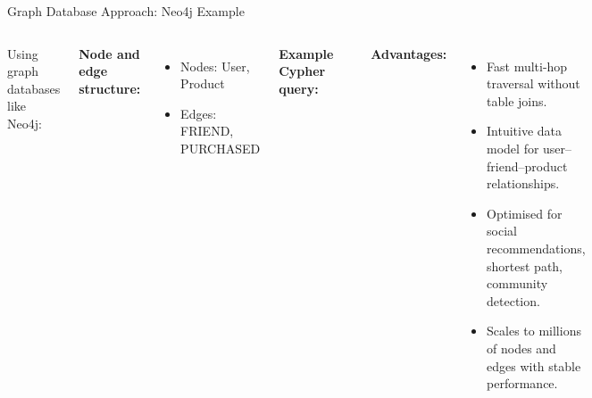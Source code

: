 \documentclass[aspectratio=169, table]{beamer}
\begin{document}
\begin{frame}[fragile]{Graph Database Approach: Neo4j Example}
	\vspace{20pt}
	
	\begin{columns}[T]
		
		Using graph databases like Neo4j:
		
		\vspace{5pt}
		\textbf{Node and edge structure:}
		\begin{itemize}
			\item Nodes: User, Product
			\item Edges: FRIEND, PURCHASED
		\end{itemize}
		
		\vspace{5pt}
		\textbf{Example Cypher query:}
\begin{lstlisting}[style=SqlStyle, basicstyle=\ttfamily\scriptsize]
MATCH (user:User)-[:FRIEND]-> 
	(friend:User)-[:PURCHASED]-> 
	(product:Product) 
WHERE user.name = "Andi" 
RETURN DISTINCT product.name;
\end{lstlisting}
		
		
		\textbf{Advantages:}
		\begin{itemize}
			\item Fast multi-hop traversal without table joins.
			\item Intuitive data model for user–friend–product relationships.
			\item Optimised for social recommendations, shortest path, community detection.
			\item Scales to millions of nodes and edges with stable performance.
		\end{itemize}
		
	\end{columns}
	
\end{frame}
\end{document}
